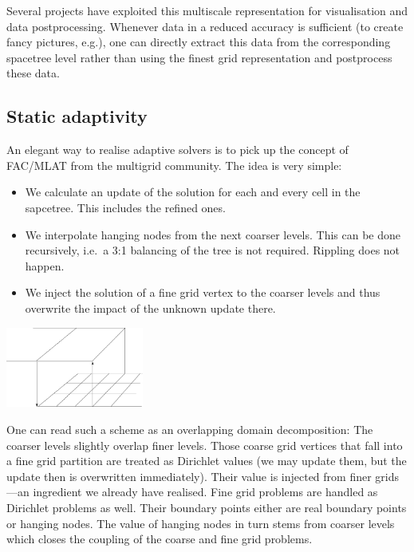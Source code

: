 \begin{remark}
Several projects have exploited this multiscale representation for visualisation
and data postprocessing. Whenever data in a reduced accuracy is sufficient (to
create fancy pictures, e.g.), one can directly extract this data from the
corresponding spacetree level rather than using the finest grid representation
and postprocess these data.
\end{remark}

\subsection{Static adaptivity}

An elegant way to realise adaptive solvers is to pick up the concept of FAC/MLAT
from the multigrid community.
The idea is very simple:
\begin{itemize}
  \item We calculate an update of the solution for each and every cell in the
  sapcetree. This includes the refined ones.
  \item We interpolate hanging nodes from the next coarser levels. This can be
  done recursively, i.e.~a 3:1 balancing of the tree is not required. Rippling
  does not happen.
  \item We inject the solution of a fine grid vertex to the coarser levels and
  thus overwrite the impact of the unknown update there. 
\end{itemize}

\begin{center}
 \includegraphics[width=0.34\textwidth]{41_heat-equation/FAC.pdf}
\end{center}


\noindent
One can read such a scheme as an overlapping domain decomposition: 
The coarser levels slightly overlap finer levels. 
Those coarse grid vertices that fall into a fine grid partition are treated as
Dirichlet values (we may update them, but the update then is overwritten
immediately).
Their value is injected from finer grids---an ingredient we already have
realised.
Fine grid problems are handled as Dirichlet problems as well. 
Their boundary points either are real boundary points or hanging nodes.
The value of hanging nodes in turn stems from coarser levels which closes the
coupling of the coarse and fine grid problems.


